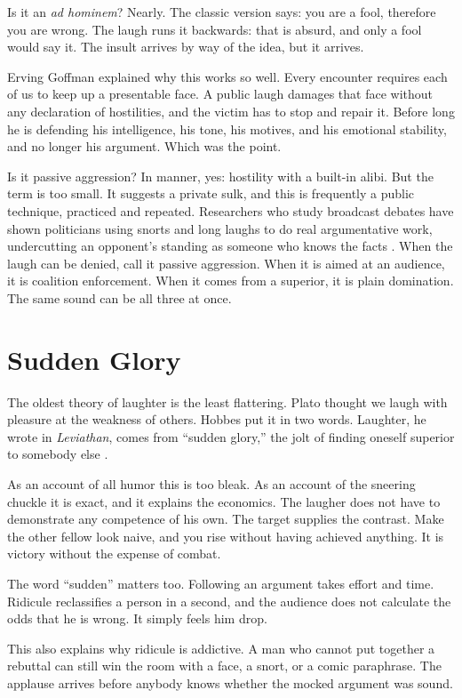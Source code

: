 \documentclass[12pt,a4paper]{book}
\begin{document}
Is it an \emph{ad hominem}? Nearly. The classic version says: you are a fool, therefore you are wrong. The laugh runs it backwards: that is absurd, and only a fool would say it. The insult arrives by way of the idea, but it arrives.

Erving Goffman explained why this works so well. Every encounter requires each of us to keep up a presentable face. A public laugh damages that face without any declaration of hostilities, and the victim has to stop and repair it. Before long he is defending his intelligence, his tone, his motives, and his emotional stability, and no longer his argument. Which was the point.

Is it passive aggression? In manner, yes: hostility with a built-in alibi. But the term is too small. It suggests a private sulk, and this is frequently a public technique, practiced and repeated. Researchers who study broadcast debates have shown politicians using snorts and long laughs to do real argumentative work, undercutting an opponent's standing as someone who knows the facts \cite{demasi2019}. When the laugh can be denied, call it passive aggression. When it is aimed at an audience, it is coalition enforcement. When it comes from a superior, it is plain domination. The same sound can be all three at once.

\section{Sudden Glory}

The oldest theory of laughter is the least flattering. Plato thought we laugh with pleasure at the weakness of others. Hobbes put it in two words. Laughter, he wrote in \emph{Leviathan}, comes from ``sudden glory,'' the jolt of finding oneself superior to somebody else \cite{hobbes1651}.

As an account of all humor this is too bleak. As an account of the sneering chuckle it is exact, and it explains the economics. The laugher does not have to demonstrate any competence of his own. The target supplies the contrast. Make the other fellow look naive, and you rise without having achieved anything. It is victory without the expense of combat.

The word ``sudden'' matters too. Following an argument takes effort and time. Ridicule reclassifies a person in a second, and the audience does not calculate the odds that he is wrong. It simply feels him drop.

This also explains why ridicule is addictive. A man who cannot put together a rebuttal can still win the room with a face, a snort, or a comic paraphrase. The applause arrives before anybody knows whether the mocked argument was sound.
\end{document}
